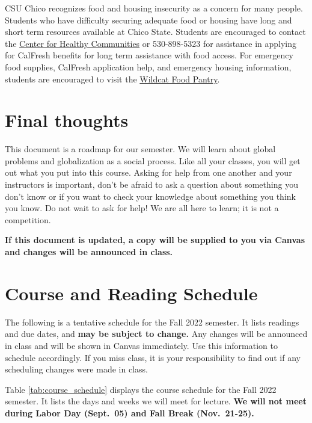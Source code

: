 \documentclass[11pt,]{article}
\begin{document}
CSU Chico recognizes food and housing insecurity as a concern for many
people. Students who have difficulty securing adequate food or housing
have long and short term resources available at Chico State. Students
are encouraged to contact the
\href{https://www.csuchico.edu/chc/}{Center for Healthy Communities} or
530-898-5323 for assistance in applying for CalFresh benefits for long
term assistance with food access. For emergency food supplies, CalFresh
application help, and emergency housing information, students are
encouraged to visit the
\href{https://www.csuchico.edu/basic-needs/pantry.shtml}{Wildcat Food
Pantry}.

\hypertarget{final-thoughts}{%
\section{Final thoughts}\label{final-thoughts}}

This document is a roadmap for our semester. We will learn about global
problems and globalization as a social process. Like all your classes,
you will get out what you put into this course. Asking for help from one
another and your instructors is important, don't be afraid to ask a
question about something you don't know or if you want to check your
knowledge about something you think you know. Do not wait to ask for
help! We are all here to learn; it is not a competition.

\textbf{If this document is updated, a copy will be supplied to you via
Canvas and changes will be announced in class.}

\newpage

\renewcommand{\arraystretch}{1.25}

\hypertarget{course-and-reading-schedule}{%
\section{Course and Reading
Schedule}\label{course-and-reading-schedule}}

The following is a tentative schedule for the Fall 2022 semester. It
lists readings and due dates, and \textbf{may be subject to change.} Any
changes will be announced in class and will be shown in Canvas
immediately. Use this information to schedule accordingly. If you miss
class, it is your responsibility to find out if any scheduling changes
were made in class.

Table \ref{tab:course_schedule} displays the course schedule for the
Fall 2022 semester. It lists the days and weeks we will meet for
lecture. \textbf{We will not meet during Labor Day (Sept.~05) and Fall
Break (Nov.~21-25).}
\end{document}
